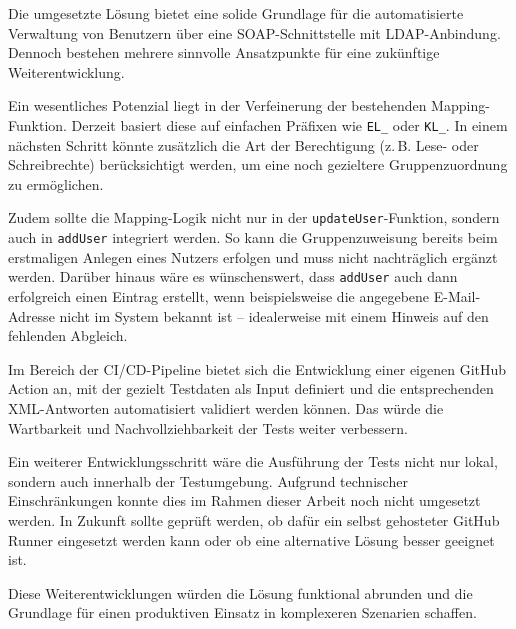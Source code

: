 Die umgesetzte Lösung bietet eine solide Grundlage für die automatisierte Verwaltung von Benutzern über eine SOAP-Schnittstelle mit LDAP-Anbindung. Dennoch bestehen mehrere sinnvolle Ansatzpunkte für eine zukünftige Weiterentwicklung.

Ein wesentliches Potenzial liegt in der Verfeinerung der bestehenden Mapping-Funktion. Derzeit basiert diese auf einfachen Präfixen wie \texttt{EL\_} oder \texttt{KL\_}. In einem nächsten Schritt könnte zusätzlich die Art der Berechtigung (z.\,B. Lese- oder Schreibrechte) berücksichtigt werden, um eine noch gezieltere Gruppenzuordnung zu ermöglichen.

Zudem sollte die Mapping-Logik nicht nur in der \texttt{updateUser}-Funktion, sondern auch in \texttt{addUser} integriert werden. So kann die Gruppenzuweisung bereits beim erstmaligen Anlegen eines Nutzers erfolgen und muss nicht nachträglich ergänzt werden. Darüber hinaus wäre es wünschenswert, dass \texttt{addUser} auch dann erfolgreich einen Eintrag erstellt, wenn beispielsweise die angegebene E-Mail-Adresse nicht im System bekannt ist – idealerweise mit einem Hinweis auf den fehlenden Abgleich.

Im Bereich der CI/CD-Pipeline bietet sich die Entwicklung einer eigenen GitHub Action an, mit der gezielt Testdaten als Input definiert und die entsprechenden XML-Antworten automatisiert validiert werden können. Das würde die Wartbarkeit und Nachvollziehbarkeit der Tests weiter verbessern.

Ein weiterer Entwicklungsschritt wäre die Ausführung der Tests nicht nur lokal, sondern auch innerhalb der Testumgebung. Aufgrund technischer Einschränkungen konnte dies im Rahmen dieser Arbeit noch nicht umgesetzt werden. In Zukunft sollte geprüft werden, ob dafür ein selbst gehosteter GitHub Runner eingesetzt werden kann oder ob eine alternative Lösung besser geeignet ist.

Diese Weiterentwicklungen würden die Lösung funktional abrunden und die Grundlage für einen produktiven Einsatz in komplexeren Szenarien schaffen.
